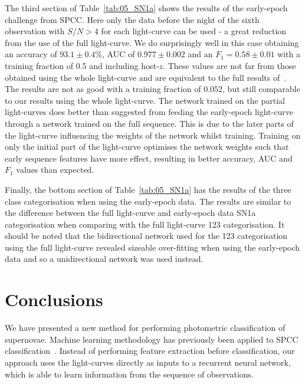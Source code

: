\documentclass[twocolumn]{aastex61}
\begin{document}
The third section of Table~\ref{tab:05_SN1a} shows the results of the early-epoch challenge from SPCC. Here only the data before the night of the sixth observation with $S/N>4$ for each light-curve can be used - a great reduction from the use of the full light-curve. We do surprisingly well in this case obtaining an accuracy of $93.1\pm0.4\%$, AUC of $0.977\pm0.002$ and an $F_1=0.58\pm 0.01$ with a training fraction of 0.5 and including host-$z$. These values are not far from those obtained using the whole light-curve and are equivalent to the full results of~\cite{Karpenka:2012pm}. The results are not as good with a training fraction of 0.052, but still comparable to our results using the whole light-curve. The network trained on the partial light-curves does better than suggested from feeding the early-epoch light-curve through a network trained on the full sequence. This is due to the later parts of the light-curve influencing the weights of the network whilst training. Training on only the initial part of the light-curve optimises the network weights such that early sequence features have more effect, resulting in better accuracy, AUC and $F_1$ values than expected.

Finally, the bottom section of Table~\ref{tab:05_SN1a} has the results of the three class categorisation when using the early-epoch data. The results are similar to the difference between the full light-curve and early-epoch data SN1a categorisation when comparing with the full light-curve 123 categorisation. It should be noted that the bidirectional network used for the 123 categorisation using the full light-curve revealed sizeable over-fitting when using the early-epoch data and so a unidirectional network was used instead.

\section{Conclusions}

We have presented a new method for performing photometric classification of supernovae. Machine learning methodology has previously been applied to SPCC classification~\cite{Newling:2010bp, Karpenka:2012pm, Lochner:2016hbn}. Instead of performing feature extraction before classification, our approach uses the light-curves directly as inputs to a recurrent neural network, which is able to learn information from the sequence of observations.
\end{document}
